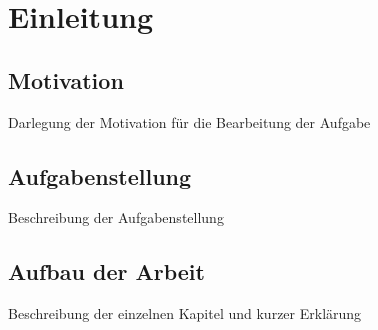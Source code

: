 \chapter{Einleitung}
\section{Motivation}
Darlegung der Motivation für die Bearbeitung der Aufgabe

\section{Aufgabenstellung}
Beschreibung der Aufgabenstellung

\section{Aufbau der Arbeit}
Beschreibung der einzelnen Kapitel und kurzer Erklärung